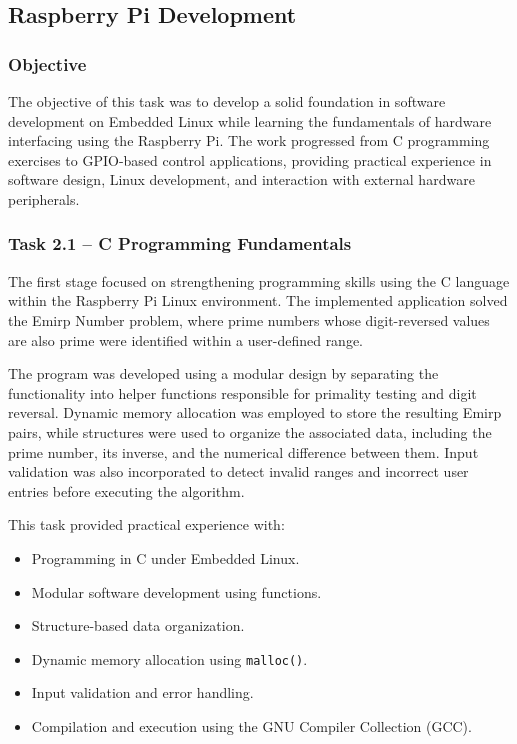 \documentclass[conference]{IEEEtran}
\begin{document}
\subsection{Raspberry Pi Development}

\subsubsection{Objective}

The objective of this task was to develop a solid foundation in software development on Embedded Linux while learning the fundamentals of hardware interfacing using the Raspberry Pi. The work progressed from C programming exercises to GPIO-based control applications, providing practical experience in software design, Linux development, and interaction with external hardware peripherals.

\subsubsection{Task 2.1 -- C Programming Fundamentals}

The first stage focused on strengthening programming skills using the C language within the Raspberry Pi Linux environment. The implemented application solved the Emirp Number problem, where prime numbers whose digit-reversed values are also prime were identified within a user-defined range.

The program was developed using a modular design by separating the functionality into helper functions responsible for primality testing and digit reversal. Dynamic memory allocation was employed to store the resulting Emirp pairs, while structures were used to organize the associated data, including the prime number, its inverse, and the numerical difference between them. Input validation was also incorporated to detect invalid ranges and incorrect user entries before executing the algorithm.

This task provided practical experience with:

\begin{itemize}
    \item Programming in C under Embedded Linux.
    \item Modular software development using functions.
    \item Structure-based data organization.
    \item Dynamic memory allocation using \texttt{malloc()}.
    \item Input validation and error handling.
    \item Compilation and execution using the GNU Compiler Collection (GCC).
\end{itemize}
\end{document}
